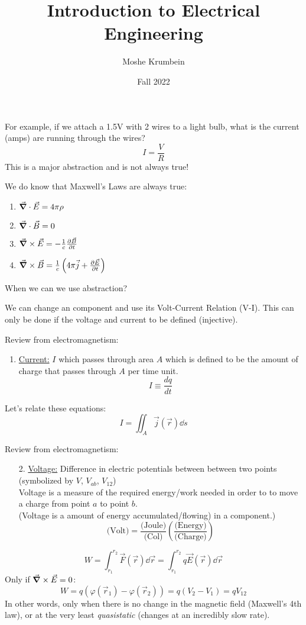 \documentclass[00_complete]{subfiles}
\title{Introduction to Electrical Engineering}
\author{Moshe Krumbein}
\date{Fall 2022}
\begin{document}

For example, if we attach a 1.5V with 2 wires to a light bulb, what is the
current (amps) are running through the wires?
$$I = \frac{V}{R}$$
This is a major abstraction and is not always true!

We do know that Maxwell's Laws are always true:
\begin{enumerate}
    \item $\vec \grad \cdot \vec E = 4 \pi \rho$
    \item $\vec \grad \cdot \vec B = 0$
    \item $\vec \grad \times \vec E = -\frac{1}{c}\pdv{\vec B}{t}$
    \item $\vec \grad \times \vec B = \frac{1}{c}\left(4 \pi \vec j
        + \pdv{\vec E}{t}\right)$
\end{enumerate}

When we can we use abstraction?

We can change an component and use its Volt-Current Relation (V-I).
This can only be done if the voltage and current to be defined (injective).

\begin{reminder}
    Review from electromagnetism:
   \begin{enumerate}
       \item \underline{Current:} $I$ which passes through area $A$ which is
           defined to be the amount of charge that passes through $A$ per time
           unit.
           $$I \equiv \frac{dq}{dt}$$
   \end{enumerate}
\end{reminder}
Let's relate these equations:
\[
    I = \iint_A \vec j (\vec  r ) \dd{s}
\]
\begin{reminder}
    Review from electromagnetism:
   \begin{enumerate}
       \item[2.] \underline{Voltage:} Difference in electric potentials between
           between two points (symbolized by $V$, $V_{ab}$, $V_{12}$) \\
           Voltage is a measure of the required energy/work needed in order to
           to move a charge from point $a$ to point $b$. \\
           (Voltage is a amount of energy accumulated/flowing) in a component.)
           \[
               \text{(Volt)} =\frac{\text{(Joule)}}{\text{(Col)}}
               \left(\frac{\text{(Energy)}}{\text{(Charge)}}\right)
           \]
   \end{enumerate}
\end{reminder}
\[
    W = \int_{r_1}^{r_2} \vec F (\vec r) \dd{\vec r} = \int_{r_1}^{r_2} q \vec
    E (\vec r) \dd{\vec r}
\]
Only if $\vec \grad \times \vec E = 0$:
\[
    W = q(\varphi(\vec r_1) - \varphi (\vec r_2)) = q(V_2-V_1)=qV_{12}
\]
In other words, only when there is no change in the magnetic field (Maxwell's
4th law), or at the very least \emph{quasistatic} (changes at an incredibly
slow rate).
\end{document}
